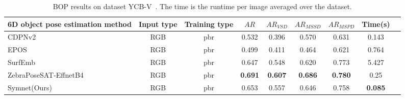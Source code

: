 \begin{table*}[t]
        \centering
        \caption{
                BOP results on dataset YCB-V~\cite{xiang2018posecnn}. The time is the runtime per image averaged over the dataset.
        }
        \begin{tabular}{l c c c c c c c c}
        \toprule
        6D object pose estimation method &Input type&Training type&$AR$&$AR_{VSD}$&$AR_{MSSD}$&$AR_{MSPD}$&Time(s)\\       %
        \midrule
        CDPNv2~\cite{li2019cdpn}&RGB&pbr&0.532&0.396&0.570&0.631&0.143 \\
        EPOS~\cite{hodan2020epos}&RGB&pbr&0.499&0.411&0.464&0.621&0.764 \\
        SurfEmb~\cite{haugaard2022surfemb}&RGB&pbr&0.647&0.548&0.620&0.773&5.427 \\
        ZebraPoseSAT-EffnetB4~\cite{su2022zebrapose}&RGB&pbr&\textbf{0.691}&\textbf{0.607}&\textbf{0.686}&\textbf{0.780}&0.25 \\
        Symnet(Ours)&RGB&pbr&0.653&0.557&0.646&0.758&\textbf{0.085} \\
        \bottomrule
        \end{tabular}
\vspace{-0.05in}
\label{tab:ycbv_bop}
\end{table*}
